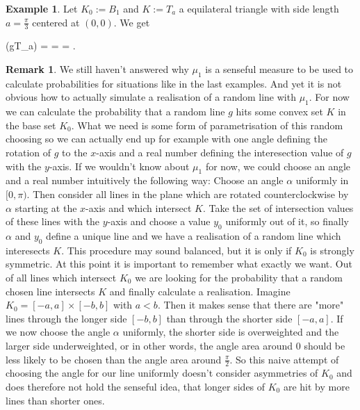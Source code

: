 \documentclass[12pt,a4paper]{scrartcl}
\numberwithin{equation}{subsection}
\newcommand{\PP}{\mathbb{P}} %
\newcommand{\1}{\mathbbm{1}}
\numberwithin{equation}{section}
\theoremstyle{definition}
\newtheorem{example}{Example}[subsection]
\newtheorem{remark}{Remark}[subsection]
\begin{document}
\begin{example}
	Let $K_0 := B_1$ and $K:=T_a$ a equilateral triangle with side length $a=\frac{\pi}{3}$ centered at $(0,0)$. We get 
	\begin{flalign*}
	\PP(g\cap T_a\neq\emptyset) =  =  = .
	\end{flalign*}
\end{example}



\begin{remark}
	We still haven't answered why $\mu_1$ is a senseful measure to be used to calculate probabilities for situations like in the last examples. And yet it is not obvious how to actually simulate a realisation of a random line with $\mu_1$. For now we can calculate the probability that a random line $g$ hits some convex set $K$ in the base set $K_0$. What we need is some form of parametrisation of this random choosing so we can actually end up for example with one angle defining the rotation of $g$ to the $x$-axis and a real number defining the interesection value of $g$ with the $y$-axis. If we wouldn't know about $\mu_1$ for now, we could choose an angle and a real number intuitively the following way: Choose an angle $\alpha$ uniformly in $[0,\pi)$. Then consider all lines in the plane which are rotated counterclockwise by $\alpha$ starting at the $x$-axis and which intersect $K$. Take the set of intersection values of these lines with the $y$-axis and choose a value $y_0$ uniformly out of it, so finally $\alpha$ and $y_0$ define a unique line and we have a realisation of a random line which interesects $K$. This procedure may sound balanced, but it is only if $K_0$ is strongly symmetric. At this point it is important to remember what exactly we want. Out of all lines which intersect $K_0$ we are looking for the probability that a random chosen line intersects $K$ and finally calculate a realisation. Imagine $K_0=[-a,a]\times [-b,b]$ with $a<b$. Then it makes sense that there are "more" lines through the longer side $[-b,b]$ than through the shorter side $[-a,a]$. If we now choose the angle $\alpha$ uniformly, the shorter side is overweighted and the larger side underweighted, or in other words, the angle area around $0$ should be less likely to be chosen than the angle area around $\frac{\pi}{2}$. So this naive attempt of choosing the angle for our line uniformly doesn't consider asymmetries of $K_0$ and does therefore not hold the senseful idea, that longer sides of $K_0$ are hit by more lines than shorter ones. 
\end{remark}
\end{document}
